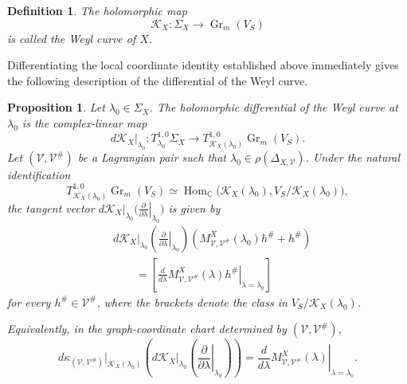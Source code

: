 \documentclass[10pt,a4paper]{amsart}
\newtheorem{prop}[thm]{Proposition}
\newtheorem{defn}[thm]{Definition}
\numberwithin{equation}{section} \numberwithin{figure}{section}
\newcommand{\mb}[1]{\mathbb{#1}} %
\newcommand{\mc}[1]{\mathcal{#1}}
\begin{document}
\begin{defn}
The holomorphic map
\[
    \mc K_X:
    \Sigma_X
    \longrightarrow
    \operatorname{Gr}_m(V_S)
\]
is called the Weyl curve of \(X\).
\end{defn}

Differentiating the local coordinate identity established above
immediately gives the following description of the differential of
the Weyl curve.

\begin{prop}\label{prop:differential-weyl-curve}
Let \(\lambda_0\in\Sigma_X\). The holomorphic differential of the
Weyl curve at \(\lambda_0\) is the complex-linear map
\[
    d\mc K_X|_{\lambda_0}:
    T_{\lambda_0}^{1,0}\Sigma_X
    \longrightarrow
    T_{\mc K_X(\lambda_0)}^{1,0}
    \operatorname{Gr}_m(V_S).
\]
Let \((\mc V,\mc V^\#)\) be a Lagrangian pair such that
\(\lambda_0\in\rho(\Delta_{X,\mc V})\). Under the natural
identification
\[
    T_{\mc K_X(\lambda_0)}^{1,0}
    \operatorname{Gr}_m(V_S)
    \simeq
    \operatorname{Hom}_{\mb C}
    \bigl(
        \mc K_X(\lambda_0),
        V_S/\mc K_X(\lambda_0)
    \bigr),
\]
the tangent vector
\(
    d\mc K_X|_{\lambda_0}
    \bigl(
        \left.\frac{\partial}{\partial\lambda}\right|_{\lambda_0}
    \bigr)
\)
is given by
\[
\begin{aligned}
    &d\mc K_X|_{\lambda_0}
    \left(
        \left.\frac{\partial}{\partial\lambda}\right|_{\lambda_0}
    \right)
    \left(
        M_{\mc V,\mc V^\#}^X(\lambda_0)h^\#+h^\#
    \right)
    \\
    &\qquad
    =
    \left[
        \left.
        \frac{d}{d\lambda}
        M_{\mc V,\mc V^\#}^X(\lambda)h^\#
        \right|_{\lambda=\lambda_0}
    \right]
\end{aligned}
\]
for every \(h^\#\in\mc V^\#\), where the brackets denote the class in
\(V_S/\mc K_X(\lambda_0)\).

Equivalently, in the graph-coordinate chart determined by
\((\mc V,\mc V^\#)\),
\[
    d\kappa_{(\mc V,\mc V^\#)}|_{\mc K_X(\lambda_0)}
    \left(
        d\mc K_X|_{\lambda_0}
        \left(
            \left.\frac{\partial}{\partial\lambda}\right|_{\lambda_0}
        \right)
    \right)
    =
    \left.
    \frac{d}{d\lambda}
    M_{\mc V,\mc V^\#}^X(\lambda)
    \right|_{\lambda=\lambda_0}.
\]
\end{prop}
\end{document}
